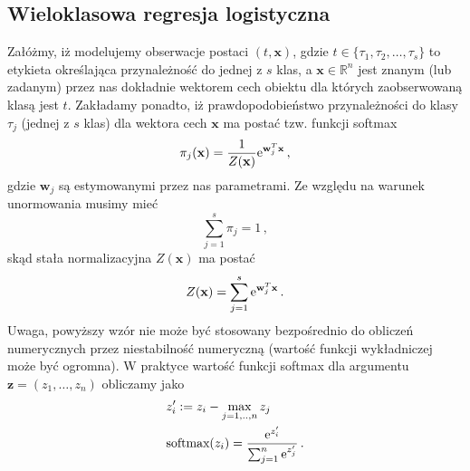 \documentclass{myclass}
\begin{document}
\subsection{Wieloklasowa regresja logistyczna}

Załóżmy, iż modelujemy obserwacje postaci \((t,\mathbf{x})\), gdzie \(t \in
\{\tau_1,\tau_2,\ldots,\tau_s\}\) to etykieta określająca przynależność do jednej z \(s\) klas, a
\(\mathbf{x} \in \mathbb{R}^n\) jest znanym (lub zadanym) przez nas dokładnie wektorem cech obiektu
dla których zaobserwowaną klasą jest \(t\). Zakładamy ponadto, iż prawdopodobieństwo przynależności
do klasy \(\tau_j\) (jednej z \(s\) klas) dla wektora cech \(\mathbf{x}\) ma postać tzw. funkcji
softmax
\begin{equation*}
    \pi_j(\mathbf{x}) = \frac{1}{Z(\mathbf{x})}\mathrm{e}^{\mathbf{w}_j^T\mathbf{x}}\,,
\end{equation*}
gdzie \(\mathbf{w}_j\) są estymowanymi przez nas parametrami. Ze względu na warunek unormowania
musimy mieć
\begin{equation*}
    \sum_{j=1}^s \pi_j = 1\,,
\end{equation*}
skąd stała normalizacyjna \(Z(\mathbf{x})\) ma postać
\begin{equation*}
    Z(\mathbf{x}) = \sum_{j=1}^s \mathrm{e}^{\mathbf{w}_j^T\mathbf{x}}\,.
\end{equation*}
Uwaga, powyższy wzór nie może być stosowany bezpośrednio do obliczeń numerycznych przez
niestabilność numeryczną (wartość funkcji wykładniczej może być ogromna). W praktyce wartość funkcji
softmax dla argumentu \(\mathbf{z} = (z_1,\ldots,z_n)\) obliczamy jako
\begin{equation*}
    \begin{split}
        &z'_i := z_i - \max_{j=1,..,n} z_j\\
        &\text{softmax}(z_i) = \frac{\mathrm{e}^{z_i'}}{\sum_{j=1}^n \mathrm{e}^{z_j'}}\,.
    \end{split}
\end{equation*}
\end{document}
